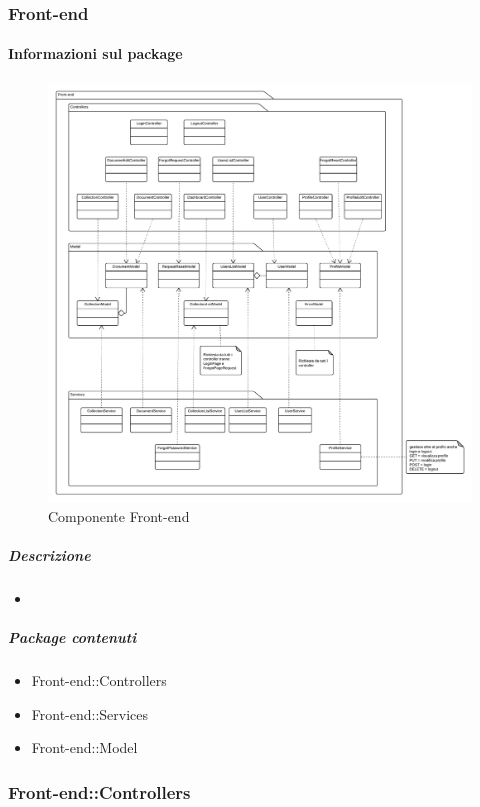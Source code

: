 
  \subsubsection{Front-end}
  \paragraph{Informazioni sul package}
    \begin{figure}[H] 
      \begin{center} 
        \includegraphics[width=\textwidth]{packages/Front-end.png}  
        \caption{Componente Front-end}
      \end{center}  
    \end{figure} 
  \subparagraph{Descrizione} 
    \begin{itemize}
    \item[] 
    \end{itemize} 
    \subparagraph{Package contenuti} 
    \begin{itemize}
        \item Front-end::Controllers
        \item Front-end::Services
        \item Front-end::Model
    \end{itemize}
  \subsubsection{Front-end::Controllers}
